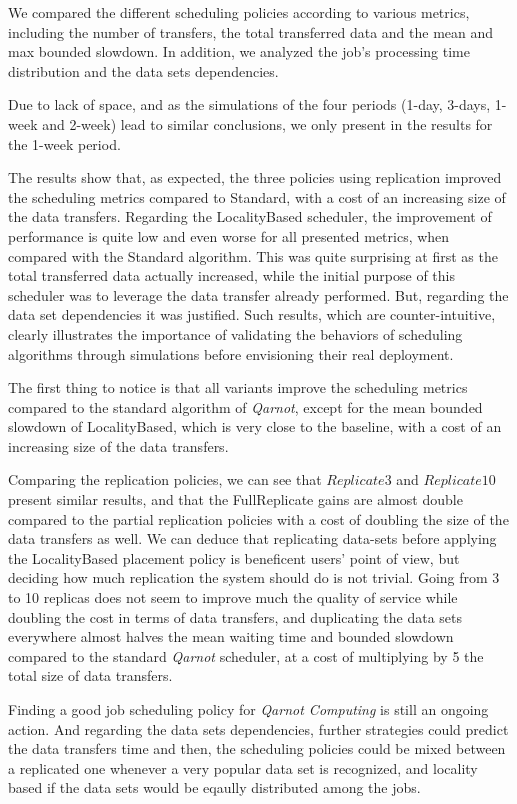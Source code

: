 We compared the different scheduling policies according to various metrics, including the number of transfers, the total transferred data and the mean and max bounded slowdown. In addition, we analyzed the job's processing time distribution and the data sets dependencies.

Due to lack of space, and as the simulations of the four periods (1-day, 3-days, 1-week and 2-week) lead to similar conclusions, we only present in  the results for the 1-week period.

The results show that, as expected, the three policies using replication improved the scheduling metrics compared to Standard, with a cost of an increasing size of the data transfers.
Regarding the LocalityBased scheduler, the improvement of performance is quite low and even worse for all presented metrics, when compared with the Standard algorithm. This was quite surprising at first as the total transferred data actually increased, while the initial purpose of this scheduler was to leverage the data transfer already performed. But, regarding the data set dependencies it was justified.
%
Such results, which are counter-intuitive, clearly illustrates the importance of validating the behaviors of scheduling algorithms through simulations before envisioning their real deployment. 

The first thing to notice is that all variants improve the scheduling metrics compared to the standard algorithm of \emph{Qarnot}, except for the mean bounded slowdown of LocalityBased, which is very close to the baseline, with a cost of an increasing size of the data transfers. 

Comparing the replication policies, we can see that $Replicate3$ and $Replicate10$ present similar results, and that the FullReplicate gains are almost double compared to the partial replication policies with a cost of doubling the size of the data transfers as well.
We can deduce that replicating data-sets before applying the LocalityBased placement policy is beneficent users' point of view, but deciding how much replication the system should do is not trivial.
Going from 3 to 10 replicas does not seem to improve much the quality of service while doubling the cost in terms of data transfers, and duplicating the data sets everywhere almost halves the mean waiting time and bounded slowdown compared to the standard \emph{Qarnot} scheduler, at a cost of multiplying by 5 the total size of data transfers.

Finding a good job scheduling policy for \emph{Qarnot Computing} is still an ongoing action. And regarding the data sets dependencies, further strategies could predict the data transfers time and then, the scheduling policies could be mixed between a replicated one whenever a very popular data set is recognized, and locality based if the data sets would be eqaully distributed among the jobs.